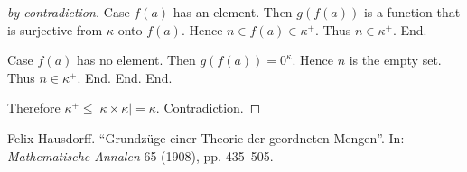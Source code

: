 \documentclass{article}
\begin{document}
\begin{forthel}
\begin{proof}[by contradiction]
          Case $f(a)$ has an element.
            Then $g(f(a))$ is a function that is surjective from $\kappa$ onto
            $f(a)$.
            Hence $n \in f(a) \in \kappa^{+}$.
            Thus $n \in \kappa^{+}$.
          End.

          Case $f(a)$ has no element.
            Then $g(f(a)) = 0^{\kappa}$.
            Hence $n$ is the empty set.
            Thus $n \in \kappa^{+}$.
          End.
        End.
      End.

      Therefore $\kappa^{+} \leq |\kappa \times \kappa| = \kappa$.
      Contradiction.
    \end{proof}
  \end{forthel}

\begin{thebibliography}{9}
  Felix Hausdorff.
  ``Grundzüge einer Theorie der geordneten Mengen''.
  In: \textit{Mathematische Annalen} 65 (1908),
  pp. 435--505.
\end{thebibliography}
\end{document}
